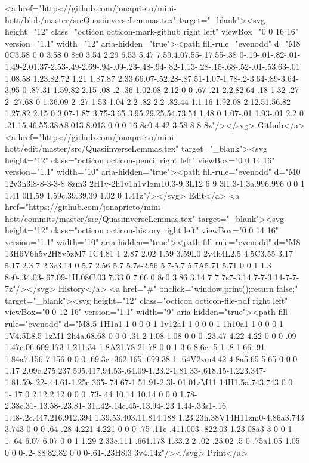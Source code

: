       <a href="https://github.com/jonaprieto/mini-hott/blob/master/srcQuasiinverseLemmas.tex" target="_blank"><svg height="12" class="octicon octicon-mark-github right left" viewBox="0 0 16 16" version="1.1" width="12" aria-hidden="true"><path fill-rule="evenodd" d="M8 0C3.58 0 0 3.58 0 8c0 3.54 2.29 6.53 5.47 7.59.4.07.55-.17.55-.38 0-.19-.01-.82-.01-1.49-2.01.37-2.53-.49-2.69-.94-.09-.23-.48-.94-.82-1.13-.28-.15-.68-.52-.01-.53.63-.01 1.08.58 1.23.82.72 1.21 1.87.87 2.33.66.07-.52.28-.87.51-1.07-1.78-.2-3.64-.89-3.64-3.95 0-.87.31-1.59.82-2.15-.08-.2-.36-1.02.08-2.12 0 0 .67-.21 2.2.82.64-.18 1.32-.27 2-.27.68 0 1.36.09 2 .27 1.53-1.04 2.2-.82 2.2-.82.44 1.1.16 1.92.08 2.12.51.56.82 1.27.82 2.15 0 3.07-1.87 3.75-3.65 3.95.29.25.54.73.54 1.48 0 1.07-.01 1.93-.01 2.2 0 .21.15.46.55.38A8.013 8.013 0 0 0 16 8c0-4.42-3.58-8-8-8z"/></svg> Github</a>
      <a href="https://github.com/jonaprieto/mini-hott/edit/master/src/QuasiinverseLemmas.tex" target="_blank"><svg height="12" class="octicon octicon-pencil right left" viewBox="0 0 14 16" version="1.1" width="10" aria-hidden="true"><path fill-rule="evenodd" d="M0 12v3h3l8-8-3-3-8 8zm3 2H1v-2h1v1h1v1zm10.3-9.3L12 6 9 3l1.3-1.3a.996.996 0 0 1 1.41 0l1.59 1.59c.39.39.39 1.02 0 1.41z"/></svg> Edit</a>
      <a href="https://github.com/jonaprieto/mini-hott/commits/master/src/QuasiinverseLemmas.tex" target="_blank"><svg height="12" class="octicon octicon-history right left" viewBox="0 0 14 16" version="1.1" width="10" aria-hidden="true"><path fill-rule="evenodd" d="M8 13H6V6h5v2H8v5zM7 1C4.81 1 2.87 2.02 1.59 3.59L0 2v4h4L2.5 4.5C3.55 3.17 5.17 2.3 7 2.3c3.14 0 5.7 2.56 5.7 5.7s-2.56 5.7-5.7 5.7A5.71 5.71 0 0 1 1.3 8c0-.34.03-.67.09-1H.08C.03 7.33 0 7.66 0 8c0 3.86 3.14 7 7 7s7-3.14 7-7-3.14-7-7-7z"/></svg> History</a>
      <a  href="#" onclick="window.print();return false;" target="_blank"><svg height="12" class="octicon octicon-file-pdf right left" viewBox="0 0 12 16" version="1.1" width="9" aria-hidden="true"><path fill-rule="evenodd" d="M8.5 1H1a1 1 0 0 0-1 1v12a1 1 0 0 0 1 1h10a1 1 0 0 0 1-1V4.5L8.5 1zM1 2h4a.68.68 0 0 0-.31.2 1.08 1.08 0 0 0-.23.47 4.22 4.22 0 0 0-.09 1.47c.06.609.173 1.211.34 1.8A21.78 21.78 0 0 1 3.6 8.6c-.5 1-.8 1.66-.91 1.84a7.156 7.156 0 0 0-.69.3c-.362.165-.699.38-1 .64V2zm4.42 4.8a5.65 5.65 0 0 0 1.17 2.09c.275.237.595.417.94.53-.64.09-1.23.2-1.81.33-.618.15-1.223.347-1.81.59s.22-.44.61-1.25c.365-.74.67-1.51.91-2.3l-.01.01zM11 14H1.5a.743.743 0 0 1-.17 0 2.12 2.12 0 0 0 .73-.44 10.14 10.14 0 0 0 1.78-2.38c.31-.13.58-.23.81-.31l.42-.14c.45-.13.94-.23 1.44-.33s1-.16 1.48-.2c.447.216.912.394 1.39.53.403.11.814.188 1.23.23h.38V14H11zm0-4.86a3.743 3.743 0 0 0-.64-.28 4.221 4.221 0 0 0-.75-.11c-.411.003-.822.03-1.23.08a3 3 0 0 1-1-.64 6.07 6.07 0 0 1-1.29-2.33c.111-.661.178-1.33.2-2 .02-.25.02-.5 0-.75a1.05 1.05 0 0 0-.2-.88.82.82 0 0 0-.61-.23H8l3 3v4.14z"/></svg> Print</a>
